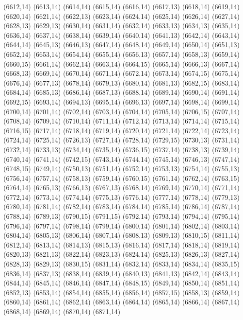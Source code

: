 (6612,14)
(6613,14)
(6614,14)
(6615,14)
(6616,14)
(6617,13)
(6618,14)
(6619,14)
(6620,14)
(6621,14)
(6622,13)
(6623,14)
(6624,14)
(6625,14)
(6626,14)
(6627,14)
(6628,13)
(6629,13)
(6630,14)
(6631,14)
(6632,14)
(6633,13)
(6634,13)
(6635,14)
(6636,14)
(6637,14)
(6638,14)
(6639,14)
(6640,14)
(6641,13)
(6642,14)
(6643,14)
(6644,14)
(6645,13)
(6646,13)
(6647,14)
(6648,14)
(6649,14)
(6650,14)
(6651,13)
(6652,14)
(6653,14)
(6654,14)
(6655,14)
(6656,13)
(6657,14)
(6658,13)
(6659,14)
(6660,15)
(6661,14)
(6662,14)
(6663,14)
(6664,15)
(6665,14)
(6666,13)
(6667,14)
(6668,13)
(6669,14)
(6670,14)
(6671,14)
(6672,14)
(6673,14)
(6674,15)
(6675,14)
(6676,14)
(6677,13)
(6678,14)
(6679,13)
(6680,14)
(6681,13)
(6682,15)
(6683,14)
(6684,14)
(6685,13)
(6686,14)
(6687,13)
(6688,14)
(6689,14)
(6690,14)
(6691,14)
(6692,15)
(6693,14)
(6694,13)
(6695,14)
(6696,13)
(6697,14)
(6698,14)
(6699,14)
(6700,14)
(6701,14)
(6702,14)
(6703,14)
(6704,14)
(6705,14)
(6706,15)
(6707,14)
(6708,14)
(6709,14)
(6710,14)
(6711,14)
(6712,14)
(6713,14)
(6714,14)
(6715,14)
(6716,15)
(6717,14)
(6718,14)
(6719,14)
(6720,14)
(6721,14)
(6722,14)
(6723,14)
(6724,14)
(6725,14)
(6726,13)
(6727,14)
(6728,14)
(6729,15)
(6730,13)
(6731,14)
(6732,14)
(6733,13)
(6734,14)
(6735,14)
(6736,15)
(6737,14)
(6738,13)
(6739,14)
(6740,14)
(6741,14)
(6742,15)
(6743,14)
(6744,14)
(6745,14)
(6746,13)
(6747,14)
(6748,15)
(6749,14)
(6750,13)
(6751,14)
(6752,14)
(6753,13)
(6754,14)
(6755,13)
(6756,14)
(6757,14)
(6758,13)
(6759,14)
(6760,15)
(6761,14)
(6762,14)
(6763,15)
(6764,14)
(6765,13)
(6766,13)
(6767,13)
(6768,14)
(6769,14)
(6770,14)
(6771,14)
(6772,14)
(6773,14)
(6774,14)
(6775,13)
(6776,14)
(6777,14)
(6778,14)
(6779,13)
(6780,14)
(6781,14)
(6782,14)
(6783,14)
(6784,14)
(6785,14)
(6786,14)
(6787,14)
(6788,14)
(6789,13)
(6790,15)
(6791,15)
(6792,14)
(6793,14)
(6794,14)
(6795,14)
(6796,14)
(6797,14)
(6798,14)
(6799,14)
(6800,14)
(6801,14)
(6802,14)
(6803,14)
(6804,14)
(6805,13)
(6806,14)
(6807,14)
(6808,13)
(6809,13)
(6810,15)
(6811,14)
(6812,14)
(6813,14)
(6814,13)
(6815,13)
(6816,14)
(6817,14)
(6818,14)
(6819,14)
(6820,13)
(6821,13)
(6822,14)
(6823,13)
(6824,14)
(6825,13)
(6826,13)
(6827,14)
(6828,13)
(6829,13)
(6830,15)
(6831,14)
(6832,14)
(6833,14)
(6834,14)
(6835,15)
(6836,14)
(6837,13)
(6838,14)
(6839,14)
(6840,13)
(6841,13)
(6842,14)
(6843,14)
(6844,14)
(6845,14)
(6846,14)
(6847,14)
(6848,15)
(6849,14)
(6850,14)
(6851,14)
(6852,13)
(6853,14)
(6854,14)
(6855,14)
(6856,14)
(6857,15)
(6858,13)
(6859,14)
(6860,14)
(6861,14)
(6862,14)
(6863,14)
(6864,14)
(6865,14)
(6866,14)
(6867,14)
(6868,14)
(6869,14)
(6870,14)
(6871,14)
